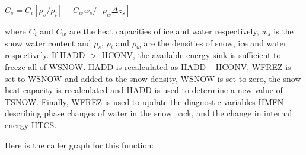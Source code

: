 $C_s = C_i [\rho_s /\rho_i] + C_w w_s/[\rho_w \Delta z_s]$

where $C_i$ and $C_w$ are the heat capacities of ice and water respectively, $w_s$ is the snow water content and $\rho_s$, $\rho_i$ and $\rho_w$ are the densities of snow, ice and water respectively. If H\+A\+D\+D $>$ H\+C\+O\+N\+V, the available energy sink is sufficient to freeze all of W\+S\+N\+O\+W. H\+A\+D\+D is recalculated as H\+A\+D\+D – H\+C\+O\+N\+V, W\+F\+R\+E\+Z is set to W\+S\+N\+O\+W and added to the snow density, W\+S\+N\+O\+W is set to zero, the snow heat capacity is recalculated and H\+A\+D\+D is used to determine a new value of T\+S\+N\+O\+W. Finally, W\+F\+R\+E\+Z is used to update the diagnostic variables H\+M\+F\+N describing phase changes of water in the snow pack, and the change in internal energy H\+T\+C\+S.

Here is the caller graph for this function\+:


